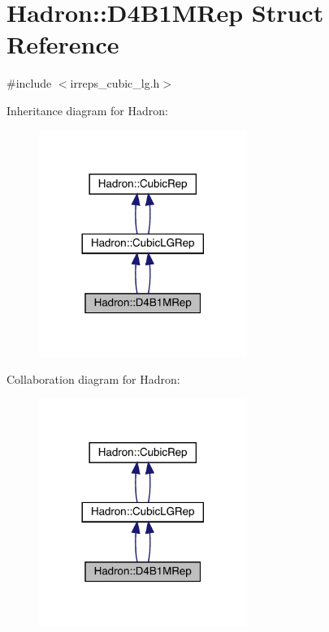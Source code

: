 \hypertarget{structHadron_1_1D4B1MRep}{}\section{Hadron\+:\+:D4\+B1\+M\+Rep Struct Reference}
\label{structHadron_1_1D4B1MRep}


{\ttfamily \#include $<$irreps\+\_\+cubic\+\_\+lg.\+h$>$}



Inheritance diagram for Hadron\+:\nopagebreak
\begin{figure}[H]
\begin{center}
\leavevmode
\includegraphics[width=192pt]{da/d62/structHadron_1_1D4B1MRep__inherit__graph}
\end{center}
\end{figure}


Collaboration diagram for Hadron\+:\nopagebreak
\begin{figure}[H]
\begin{center}
\leavevmode
\includegraphics[width=192pt]{d1/ded/structHadron_1_1D4B1MRep__coll__graph}
\end{center}
\end{figure}
